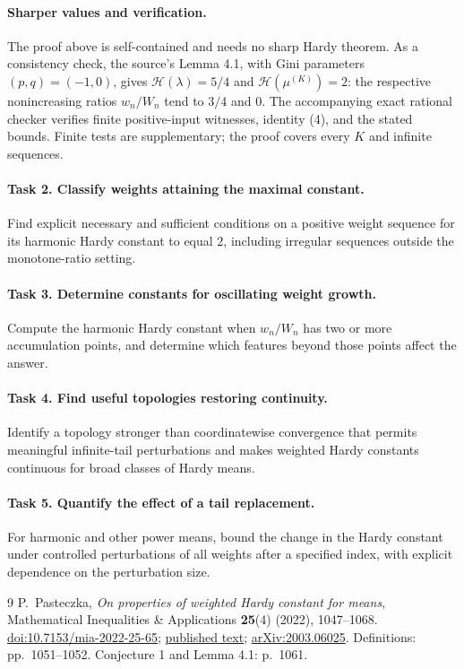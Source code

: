 \documentclass[11pt]{article}
\newcommand{\HM}{\mathscr H}
\begin{document}
\paragraph{Sharper values and verification.}
The proof above is self-contained and needs no sharp Hardy theorem.
As a consistency check, the source's Lemma 4.1, with Gini parameters
\((p,q)=(-1,0)\), gives \(\HM(\lambda)=5/4\) and
\(\HM(\mu^{(K)})=2\): the respective nonincreasing ratios
\(w_n/W_n\) tend to \(3/4\) and \(0\).
The accompanying exact rational checker verifies finite positive-input
witnesses, identity (4), and the stated bounds. Finite tests are
supplementary; the proof covers every \(K\) and infinite sequences.

\paragraph{Task 2. Classify weights attaining the maximal constant.}
Find explicit necessary and sufficient conditions on a positive
weight sequence for its harmonic Hardy constant to equal \(2\),
including irregular sequences outside the monotone-ratio setting.

\paragraph{Task 3. Determine constants for oscillating weight growth.}
Compute the harmonic Hardy constant when \(w_n/W_n\) has two or
more accumulation points, and determine which features beyond those
points affect the answer.

\paragraph{Task 4. Find useful topologies restoring continuity.}
Identify a topology stronger than coordinatewise convergence that
permits meaningful infinite-tail perturbations and makes weighted
Hardy constants continuous for broad classes of Hardy means.

\paragraph{Task 5. Quantify the effect of a tail replacement.}
For harmonic and other power means, bound the change in the Hardy
constant under controlled perturbations of all weights after a
specified index, with explicit dependence on the perturbation size.

\begin{thebibliography}{9}
P.~Pasteczka, \emph{On properties of weighted Hardy constant for means},
Mathematical Inequalities \& Applications \textbf{25}(4) (2022),
1047--1068.
\href{https://doi.org/10.7153/mia-2022-25-65}{doi:10.7153/mia-2022-25-65};
\href{https://files.ele-math.com/articles/mia-25-65.pdf}{published text};
\href{https://arxiv.org/abs/2003.06025}{arXiv:2003.06025}.
Definitions: pp.~1051--1052. Conjecture 1 and Lemma 4.1: p.~1061.
\end{thebibliography}
\end{document}
